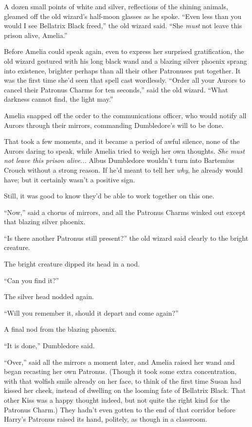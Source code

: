 A dozen small points of white and silver, reflections of the shining animals, gleamed off the old wizard’s half-moon glasses as he spoke. “Even less than you would I see Bellatrix Black freed,” the old wizard said. “She \emph{must} not leave this prison alive, Amelia.”

Before Amelia could speak again, even to express her surprised gratification, the old wizard gestured with his long black wand and a blazing silver phoenix sprang into existence, brighter perhaps than all their other Patronuses put together. It was the first time she’d seen that spell cast wordlessly. “Order all your Aurors to cancel their Patronus Charms for ten seconds,” said the old wizard. “What darkness cannot find, the light may.”

Amelia snapped off the order to the communications officer, who would notify all Aurors through their mirrors, commanding Dumbledore’s will to be done.

That took a few moments, and it became a period of awful silence, none of the Aurors daring to speak, while Amelia tried to weigh her own thoughts. \emph{She must not leave this prison alive...} Albus Dumbledore wouldn’t turn into Bartemius Crouch without a strong reason. If he’d meant to tell her \emph{why}, he already would have; but it certainly wasn’t a positive sign.

Still, it was good to know they’d be able to work together on this one.

“Now,” said a chorus of mirrors, and all the Patronus Charms winked out except that blazing silver phoenix.

“Is there another Patronus still present?” the old wizard said clearly to the bright creature.

The bright creature dipped its head in a nod.

“Can you find it?”

The silver head nodded again.

“Will you remember it, should it depart and come again?”

A final nod from the blazing phoenix.

“It is done,” Dumbledore said.

“Over,” said all the mirrors a moment later, and Amelia raised her wand and began recasting her own Patronus. (Though it took some extra concentration, with that wolfish smile already on her face, to think of the first time Susan had kissed her cheek, instead of dwelling on the looming fate of Bellatrix Black. That other Kiss was a happy thought indeed, but not quite the right kind for the Patronus Charm.)
\sbreak
They hadn’t even gotten to the end of that corridor before Harry’s Patronus raised its hand, politely, as though in a classroom.

